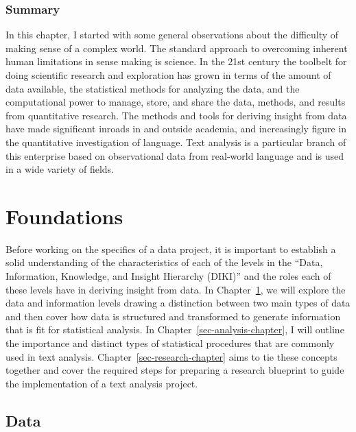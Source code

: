 \documentclass[
  letterpaper,
  krantz1]{latex/krantz-mod}
\newcommand{\setDOI}[1]{%
  \gdef\doi{%
    \footnotesize%
    #1\par%
    This chapter has been made available under a CC-BY-NC-ND license.%
  }%
}
\theoremstyle{definition}
\theoremstyle{definition}
\theoremstyle{remark}
\begin{document}
\section*{Summary}\label{summary}


In this chapter, I started with some general observations about the
difficulty of making sense of a complex world. The standard approach to
overcoming inherent human limitations in sense making is science. In the
21st century the toolbelt for doing scientific research and exploration
has grown in terms of the amount of data available, the statistical
methods for analyzing the data, and the computational power to manage,
store, and share the data, methods, and results from quantitative
research. The methods and tools for deriving insight from data have made
significant inroads in and outside academia, and increasingly figure in
the quantitative investigation of language. Text analysis is a
particular branch of this enterprise based on observational data from
real-world language and is used in a wide variety of fields.

\part{Foundations}

Before working on the specifics of a data project, it is important to
establish a solid understanding of the characteristics of each of the
levels in the ``Data, Information, Knowledge, and Insight Hierarchy
(DIKI)'' and the roles each of these levels have in deriving insight
from data. In Chapter~\ref{sec-data-chapter}, we will explore the data
and information levels drawing a distinction between two main types of
data and then cover how data is structured and transformed to generate
information that is fit for statistical analysis. In
Chapter~\ref{sec-analysis-chapter}, I will outline the importance and
distinct types of statistical procedures that are commonly used in text
analysis. Chapter~\ref{sec-research-chapter} aims to tie these concepts
together and cover the required steps for preparing a research blueprint
to guide the implementation of a text analysis project.

\chapter{Data}\label{sec-data-chapter}

\setDOI{10.4324/9781003393764.2}
\thispagestyle{chapterfirstpage}
\end{document}
